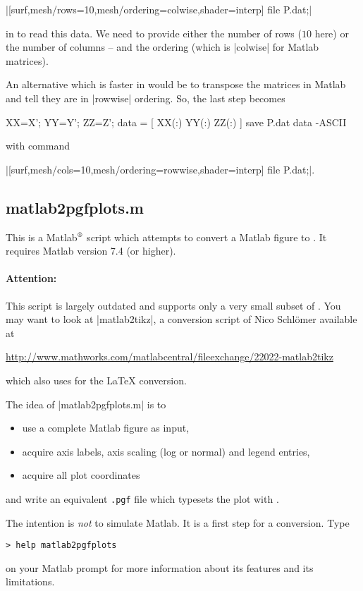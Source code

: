 {\begin{pgfgraphicnamed}
|[surf,mesh/rows=10,mesh/ordering=colwise,shader=interp] file {P.dat};|

in \PGFPlots{} to read this data. We need to provide either the number of rows
($10$ here) or the number of columns -- and the ordering (which is |colwise|
for Matlab matrices).

An alternative which is faster in \PGFPlots{} would be to transpose the
matrices in Matlab and tell \PGFPlots{} they are in |rowwise| ordering. So, the
last step becomes
%
\begin{codeexample}
XX=X'; YY=Y'; ZZ=Z';
data = [ XX(:) YY(:) ZZ(:) ]
save P.dat data -ASCII
\end{codeexample}
%
\noindent with \PGFPlots{} command

|[surf,mesh/cols=10,mesh/ordering=rowwise,shader=interp] file {P.dat};|.


\subsection{matlab2pgfplots.m}

This is a Matlab$^\text{\textregistered}$ script which attempts to convert a
Matlab figure to \PGFPlots{}. It requires Matlab version 7.4 (or higher).


\paragraph{Attention:}

This script is largely outdated and supports only a very small subset of
\PGFPlots{}. You may want to look at |matlab2tikz|, a conversion script of Nico
Schl\"omer available at

\url{http://www.mathworks.com/matlabcentral/fileexchange/22022-matlab2tikz}

\noindent which also uses \PGFPlots{} for the \LaTeX{} conversion.

\medskip
The idea of |matlab2pgfplots.m| is to
%
\begin{itemize}
    \item use a complete Matlab figure as input,
    \item acquire axis labels, axis scaling (log or normal) and legend
        entries,
    \item acquire all plot coordinates
\end{itemize}
%
and write an equivalent \texttt{.pgf} file which typesets the plot with
\PGFPlots{}.

The intention is \emph{not} to simulate Matlab. It is a first step for a
conversion. Type
%
\begin{lstlisting}
> help matlab2pgfplots
\end{lstlisting}
%
on your Matlab prompt for more information about its features and its
limitations.


\end{pgfgraphicnamed}}
